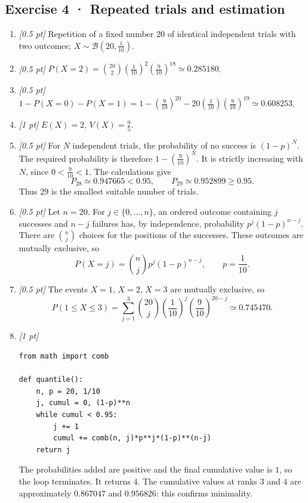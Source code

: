 \subsection*{Exercise 4 · Repeated trials and estimation}\begin{enumerate}

\item \textit{[0.5 pt]} Repetition of a fixed number $20$ of identical independent trials with two outcomes; $X\sim\mathcal B(20,\frac{1}{10})$.

\item \textit{[0.5 pt]} $P(X=2)=\binom{20}2(\frac{1}{10})^2(\frac{9}{10})^{18}\simeq0.285180$.

\item \textit{[0.5 pt]} $1-P(X=0)-P(X=1)=1-(\frac{9}{10})^{20}-20(\frac{1}{10})(\frac{9}{10})^{19}\simeq0.608253$.

\item \textit{[1 pt]} $E(X)=2$, $V(X)=\frac{9}{5}$.

\item \textit{[0.5 pt]} For $N$ independent trials, the probability of no success is $(1-p)^N$. The required probability is therefore $1-(\frac{9}{10})^N$. It is strictly increasing with $N$, since $0<\frac{9}{10}<1$. The calculations give
\[P_{28}\simeq0.947665<0.95,\qquad P_{29}\simeq0.952899\ge0.95.\]
Thus $29$ is the smallest suitable number of trials.

\item \textit{[0.5 pt]} Let $n=20$. For $j\in\{0,\ldots,n\}$, an ordered outcome containing $j$ successes and $n-j$ failures has, by independence, probability $p^j(1-p)^{n-j}$. There are $\binom nj$ choices for the positions of the successes. These outcomes are mutually exclusive, so
\[P(X=j)=\binom nj p^j(1-p)^{n-j},\qquad p=\frac{1}{10}.\]

\item \textit{[0.5 pt]} The events $X=1$, $X=2$, $X=3$ are mutually exclusive, so
\[P(1\le X\le3)=\sum_{j=1}^3\binom{20}j(\frac{1}{10})^j(\frac{9}{10})^{20-j}\simeq0.745470.\]


\item \textit{[1 pt]} 
\begin{lstlisting}
from math import comb

def quantile():
    n, p = 20, 1/10
    j, cumul = 0, (1-p)**n
    while cumul < 0.95:
        j += 1
        cumul += comb(n, j)*p**j*(1-p)**(n-j)
    return j
\end{lstlisting}
The probabilities added are positive and the final cumulative value is $1$, so the loop terminates. It returns $4$. The cumulative values at ranks $3$ and $4$ are approximately $0.867047$ and $0.956826$: this confirms minimality.

\end{enumerate}

\fi

\fi

